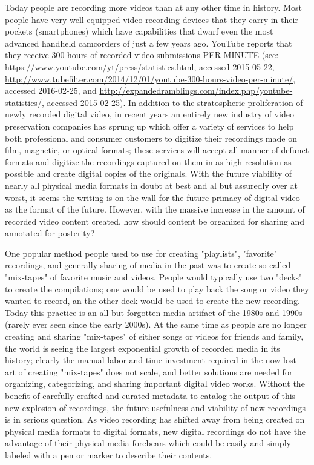Today people are recording more videos than at any other time in history. Most people have very well equipped video recording devices that they carry in their pockets (smartphones) which have capabilities that dwarf even the most advanced handheld camcorders of just a few years ago.  YouTube reports that they receive 300 hours of recorded video submissions PER MINUTE (see: \url{https://www.youtube.com/yt/press/statistics.html}, accessed 2015-05-22, \url{http://www.tubefilter.com/2014/12/01/youtube-300-hours-video-per-minute/}, accessed 2016-02-25, and \url{http://expandedramblings.com/index.php/youtube-statistics/}, accessed 2015-02-25).  In addition to the stratospheric proliferation of newly recorded digital video, in recent years an entirely new industry of video preservation companies has sprung up which offer a variety of services to help both professional and consumer customers to digitize their recordings made on film, magnetic, or optical formats; these services will accept all manner of defunct formats and digitize the recordings captured on them in as high resolution as possible and create digital copies of the originals.  With the future viability of nearly all physical media formats in doubt at best and al but assuredly over at worst, it seems the writing is on the wall for the future primacy of digital video as the format of the future.  However, with the massive increase in the amount of recorded video content created, how should content be organized for sharing and annotated for posterity?

One popular method people used to use for creating "playlists", "favorite" recordings, and generally sharing of media in the past was to create so-called "mix-tapes" of favorite music and videos.  People would typically use two "decks" to create the compilations; one would be used to play back the song or video they wanted to record, an the other deck would be used to create the new recording.  Today this practice is an all-but forgotten media artifact of the 1980s and 1990s (rarely ever seen since the early 2000s).  At the same time as people are no longer creating and sharing "mix-tapes" of either songs or videos for friends and family, the world is seeing the largest exponential growth of recorded media in its history; clearly the manual labor and time investment required in the now lost art of creating "mix-tapes" does not scale, and better solutions are needed for organizing, categorizing, and sharing important digital video works.  Without the benefit of carefully crafted and curated metadata to catalog the output of this new explosion of recordings, the future usefulness and viability of new recordings is in serious question.  As video recording has shifted away from being created on physical media formats to digital formats, new digital recordings do not have the advantage of their physical media forebears which could be easily and simply labeled with a pen or marker to describe their contents.

